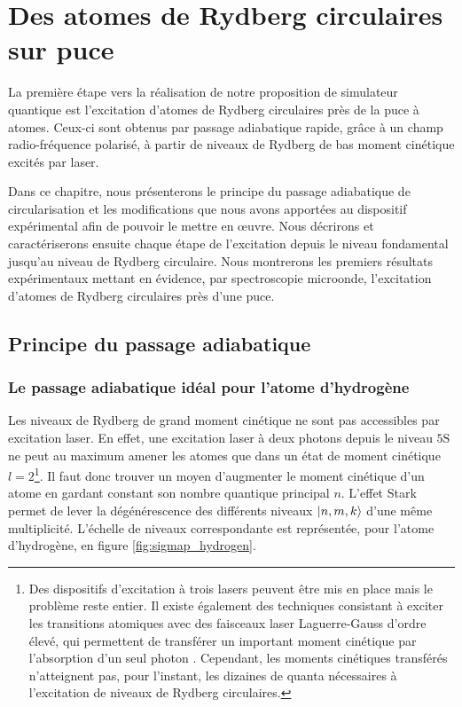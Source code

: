\chapter{Des atomes de Rydberg circulaires sur puce}
\label{chapter:50c}
\vfill
\minitoc
\newpage

\noindent La première étape vers la réalisation de notre proposition de simulateur quantique est l'excitation d'atomes de Rydberg circulaires près de la puce à atomes.
Ceux-ci sont obtenus par passage adiabatique rapide, grâce à un champ radio-fréquence polarisé,  à partir de niveaux de Rydberg de bas moment cinétique excités par laser.

Dans ce chapitre, nous présenterons le principe du passage adiabatique de circularisation et les modifications que nous avons apportées au dispositif expérimental afin de pouvoir le mettre en \oe uvre.
Nous décrirons et caractériserons ensuite chaque étape de l'excitation depuis le niveau fondamental jusqu'au niveau de Rydberg circulaire.
Nous montrerons les premiers résultats expérimentaux mettant en évidence, par spectroscopie microonde, l'excitation d'atomes de Rydberg circulaires près d'une puce.

\section{Principe du passage adiabatique}
 \subsection{Le passage adiabatique idéal pour l'atome d'hydrogène}
\noindent Les niveaux de Rydberg de grand moment cinétique ne sont pas accessibles par excitation laser.
En effet, une excitation laser à deux photons depuis le niveau $\mathrm{5S}$ ne peut au maximum amener les atomes que dans un état de moment cinétique $l=2$\footnote{
Des dispositifs d'excitation à trois lasers peuvent être mis en place mais le problème reste entier.
Il existe également des techniques consistant à exciter les transitions atomiques avec des faisceaux laser Laguerre-Gauss d'ordre élevé, qui permettent de transférer un important moment cinétique par l'absorption d'un seul photon \cite{schmiegelow2016transfer}.
Cependant, les moments cinétiques transférés n'atteignent pas, pour l'instant, les dizaines de quanta nécessaires à l'excitation de niveaux de Rydberg circulaires.
}.
Il faut donc trouver un moyen d'augmenter le moment cinétique d'un atome en gardant constant son nombre quantique principal $n$.
L'effet Stark permet de lever la dégénérescence des différents niveaux $\ket{n,m,k}$ d'une même multiplicité.
L'échelle de niveaux correspondante est représentée, pour l'atome d'hydrogène, en figure \eqref{fig:sigmap_hydrogen}.

